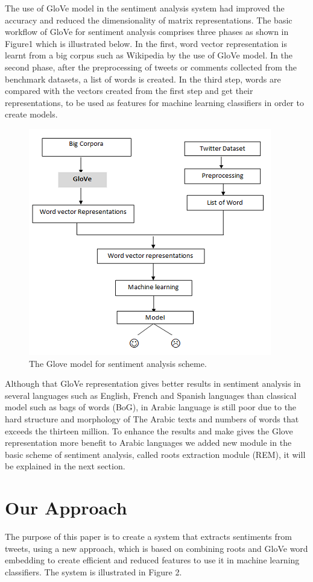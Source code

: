 \documentclass[conference]{IEEEtran}
\begin{document}
The use of GloVe model in the sentiment analysis system had improved the accuracy and reduced the dimensionality of matrix representations. The basic workflow of GloVe for sentiment analysis comprises three phases as shown in Figure1 which is illustrated below. In the first, word vector representation is learnt from a big corpus such as Wikipedia by the use of GloVe model. In the second phase, after the preprocessing of tweets or comments collected from the benchmark datasets, a list of words is created. In the third step, words are compared with the vectors created from the first step and get their representations, to be used as features for machine learning classifiers in order to create models.
\begin{figure}[htbp]
	\centerline{\includegraphics[scale=0.9]{GloveSA.png}}
	\caption{The Glove model for sentiment analysis scheme.}
	\label{fig}
\end{figure}
Although that GloVe representation gives better results in sentiment analysis in several languages such as English, French and Spanish languages than classical model such as bags of words (BoG), in Arabic language is still poor due to the hard structure and morphology of The Arabic texts and numbers of words that exceeds the thirteen million. To enhance the results and make gives the Glove representation more benefit to Arabic languages we added new module in the basic scheme of sentiment analysis, called roots extraction module (REM), it will be explained in the next section.

\section{Our Approach}
The purpose of this paper is to create a system that extracts sentiments from tweets, using a new approach, which is based on combining roots and GloVe word embedding to create efficient and reduced features to use it in machine learning classifiers. The system is illustrated in Figure 2.
\end{document}
